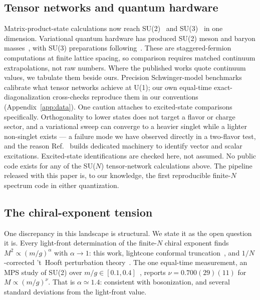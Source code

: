 \subsection{Tensor networks and quantum hardware}
\label{sec:modern-tn}

Matrix-product-state calculations now reach
SU(2)~\cite{Silvi:2016cas,Banuls:2017ena} and
SU(3)~\cite{Silvi:2019wnf,Hayata:2023pkw} in one dimension.  Variational
quantum hardware has produced SU(2) meson and baryon
masses~\cite{Atas:2021ext}, with SU(3) preparations
following~\cite{Farrell:2022wyt}.  These are staggered-fermion computations
at finite lattice spacing, so comparison requires matched continuum
extrapolations, not raw numbers.  Where the published works quote
continuum values, we tabulate them beside ours.  Precision Schwinger-model
benchmarks~\cite{Banuls:2013jaa,Dempsey:2022nys} calibrate what tensor
networks achieve at U(1); our own equal-time exact-diagonalization
cross-checks reproduce them in our conventions
(Appendix~\ref{app:data}).  One caution attaches to excited-state
comparisons specifically.  Orthogonality to lower states does not target a
flavor or charge sector, and a variational sweep can converge to a heavier
singlet while a lighter non-singlet exists --- a failure mode we have
observed directly in a two-flavor test, and the reason
Ref.~\cite{Banuls:2013jaa} builds dedicated machinery to identify vector
and scalar excitations.  Excited-state identifications are checked here,
not assumed.  No public code exists for any of the SU($N$)
tensor-network calculations above.  The pipeline released with this paper
is, to our knowledge, the first reproducible finite-$N$ spectrum code in
either quantization.

\subsection{The chiral-exponent tension}
\label{sec:modern-tension}

One discrepancy in this landscape is structural.  We state it as the open
question it is.  Every light-front determination of the finite-$N$ chiral
exponent finds $M^2 \propto (m/g)^\alpha$ with $\alpha \to 1$: this work,
lightcone conformal truncation~\cite{Anand:2021qnd}, and $1/N$-corrected
't~Hooft perturbation theory~\cite{Kochergin:2024quv}.  The one equal-time
measurement, an MPS study of SU(2) over $m/g \in
[0.1, 0.4]$~\cite{Banuls:2017ena}, reports $\nu = 0.700(29)(11)$ for
$M \propto (m/g)^{\nu}$.  That is $\alpha \simeq 1.4$: consistent with
bosonization, and several standard deviations from the light-front value.

